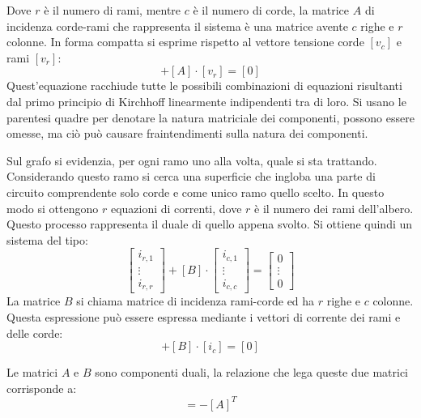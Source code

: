 \documentclass{article}
\numberwithin{equation}{subsection}
\begin{document}
Dove $r$ è il numero di rami, mentre $c$ è il numero di corde, la matrice $A$ di incidenza corde-rami che rappresenta il sistema è una matrice avente $c$ righe e $r$ colonne. 
In forma compatta si esprime rispetto al vettore tensione corde $[v_c]$ e rami $[v_r]$:
\begin{equation*}
    [v_c]+[A]\cdot[v_r]=[0]
\end{equation*}
Quest'equazione racchiude tutte le possibili combinazioni di equazioni risultanti dal primo principio di Kirchhoff linearmente indipendenti tra di loro. 
Si usano le parentesi quadre per denotare la natura matriciale dei componenti, possono essere omesse, ma ciò può causare fraintendimenti sulla natura dei componenti. 


Sul grafo si evidenzia, per ogni ramo uno alla volta, quale si sta trattando. Considerando questo ramo si cerca una superficie che ingloba una parte di circuito comprendente 
solo corde e come unico ramo quello scelto. In questo modo si ottengono $r$ equazioni di correnti, dove $r$ è il numero dei rami dell'albero. Questo processo rappresenta il duale 
di quello appena svolto. Si ottiene quindi un sistema del tipo:
\begin{equation*}
    \begin{bmatrix}
        i_{r,1}\\
        \vdots\\
        i_{r,r}
    \end{bmatrix}+[B]\cdot\begin{bmatrix}
        i_{c,1}\\
        \vdots\\
        i_{c,c}
    \end{bmatrix}=\begin{bmatrix}
        0\\
        \vdots\\
        0
    \end{bmatrix}
\end{equation*}
La matrice $B$ si chiama matrice di incidenza rami-corde ed ha $r$ righe e $c$ colonne. Questa espressione può essere espressa mediante i vettori di corrente dei rami e delle 
corde:
\begin{equation*}
    [i_{r}]+[B]\cdot [i_{c}]=[0]
\end{equation*}

Le matrici $A$ e $B$ sono componenti duali, la relazione che lega queste due matrici corrisponde a:
\begin{equation*}
    [B]=-[A]^T
\end{equation*}
\end{document}
